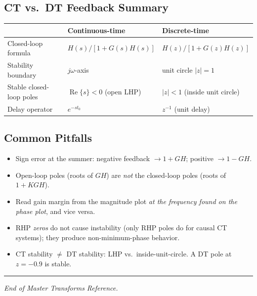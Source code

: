 \documentclass[10pt]{article}
\newcommand{\Real}{\operatorname{Re}}
\begin{document}
\subsection{CT vs.\ DT Feedback Summary}
\begin{center}
\begin{tabular}{@{}lll@{}}
\toprule
 & Continuous-time & Discrete-time \\
\midrule
Closed-loop formula & $H(s)/[1+G(s)H(s)]$ & $H(z)/[1+G(z)H(z)]$ \\
Stability boundary & $j\omega$-axis & unit circle $|z|=1$ \\
Stable closed-loop poles & $\Real\{s\}<0$ (open LHP) & $|z|<1$ (inside unit circle) \\
Delay operator & $e^{-st_0}$ & $z^{-1}$ (unit delay) \\
\bottomrule
\end{tabular}
\end{center}

\subsection{Common Pitfalls}
\begin{itemize}\setlength\itemsep{-2pt}
\item Sign error at the summer: negative feedback $\to 1+GH$; positive $\to 1-GH$.
\item Open-loop poles (roots of $GH$) are \emph{not} the closed-loop poles
(roots of $1+KGH$).
\item Read gain margin from the magnitude plot \emph{at the frequency found on
the phase plot}, and vice versa.
\item RHP \emph{zeros} do not cause instability (only RHP poles do for causal
CT systems); they produce non-minimum-phase behavior.
\item CT stability $\neq$ DT stability: LHP vs.\ inside-unit-circle. A DT pole
at $z=-0.9$ is stable.
\end{itemize}

\vspace{1em}
\hrule
\vspace{0.5em}
\centerline{\small\textit{End of Master Transforms Reference.}}
\end{document}
